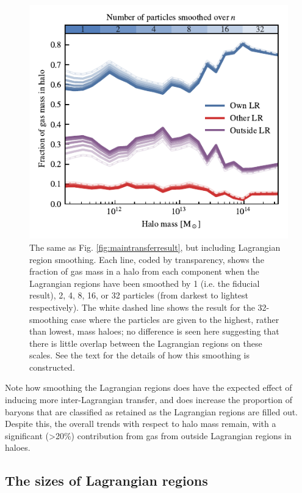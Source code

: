 \begin{figure}
	\centering
	\includegraphics{figures/convergence_smoothing.pdf}
	\vspace{-0.7cm}
 \caption{The same as Fig. \ref{fig:maintransferresult}, but including
 Lagrangian region smoothing. Each line, coded by transparency, shows the
 fraction of gas mass in a halo from each component when the Lagrangian
 regions have been smoothed by 1 (i.e. the fiducial result), 2, 4, 8, 16, or
 32 particles (from darkest to lightest respectively). The white dashed line
 shows the result for the 32-smoothing case where the particles are given to
 the highest, rather than lowest, mass haloes; no difference is seen here
 suggesting that there is little overlap between the Lagrangian regions on
 these scales. See the text for the details of how this smoothing is
 constructed.}
	\label{fig:smoothconv}
\end{figure}

Note how smoothing the Lagrangian regions does have the expected effect of
inducing more inter-Lagrangian transfer, and does increase the proportion of
baryons that are classified as retained as the Lagrangian regions are filled
out. Despite this, the overall trends with respect to halo mass remain, with
a significant (>20\%) contribution from gas from outside Lagrangian regions
in haloes.

\subsection{The sizes of Lagrangian regions}

